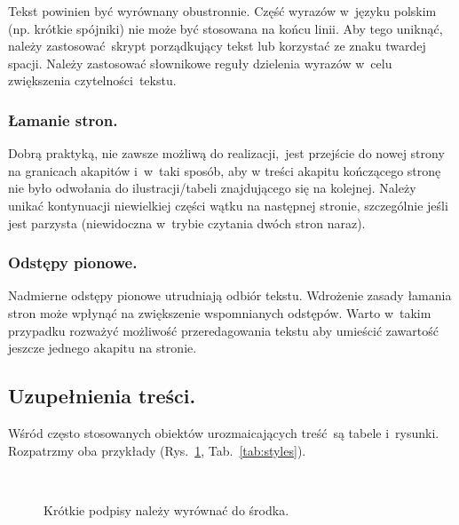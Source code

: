 Tekst powinien być wyrównany obustronnie. Część wyrazów w~języku polskim (np. krótkie spójniki) nie może być stosowana na końcu linii. Aby tego uniknąć, należy zastosować skrypt porządkujący tekst lub korzystać ze znaku twardej spacji. Należy zastosować słownikowe reguły dzielenia wyrazów w~celu zwiększenia czytelności tekstu.

\subsubsection{Łamanie stron.}
\label{subsubsec:pagebreak}

Dobrą praktyką, nie zawsze możliwą do realizacji, jest przejście do nowej strony na granicach akapitów i~w~taki sposób, aby w treści akapitu kończącego stronę nie było odwołania do ilustracji/tabeli znajdującego się na kolejnej. Należy unikać kontynuacji niewielkiej części wątku na następnej stronie, szczególnie jeśli jest parzysta (niewidoczna w~trybie czytania dwóch stron naraz).

\subsubsection{Odstępy pionowe.}
\label{subsubsec:verticalSpace}

Nadmierne odstępy pionowe utrudniają odbiór tekstu. Wdrożenie zasady łamania stron może wpłynąć na zwiększenie wspomnianych odstępów. Warto w~takim przypadku rozważyć możliwość przeredagowania tekstu aby umieścić zawartość jeszcze jednego akapitu na stronie.

\subsection{Uzupełnienia treści.}
\label{subsec:additions}

Wśród często stosowanych obiektów urozmaicających treść są tabele i~rysunki. Rozpatrzmy oba przykłady (Rys.~\ref{fig:devop}, Tab.~\ref{tab:styles}).

{

\begin{figure}[!h]
	\vspace{-10pt}
	\centering
	\\
		\caption{Krótkie podpisy należy wyrównać do środka.}
		\label{fig:devop}
\end{figure}
}


